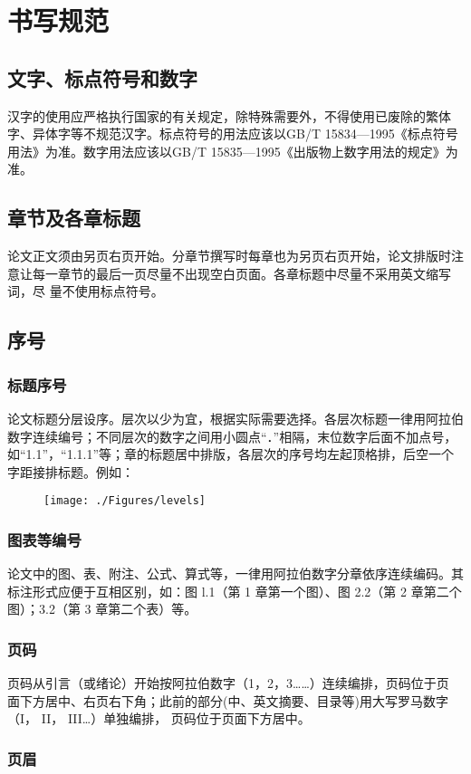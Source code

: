 
\chapter{书写规范}
\section{文字、标点符号和数字}
汉字的使用应严格执行国家的有关规定，除特殊需要外，不得使用已废除的繁体字、异体字等不规范汉字。标点符号的用法应该以GB/T 15834—1995《标点符号用法》为准。数字用法应该以GB/T 15835—1995《出版物上数字用法的规定》为准。
\section{章节及各章标题}
论文正文须由另页右页开始。分章节撰写时每章也为另页右页开始，论文排版时注 意让每一章节的最后一页尽量不出现空白页面。各章标题中尽量不采用英文缩写词，尽 量不使用标点符号。
\section{序号}
\subsection{标题序号}
论文标题分层设序。层次以少为宜，根据实际需要选择。各层次标题一律用阿拉伯数字连续编号；不同层次的数字之间用小圆点“．”相隔，末位数字后面不加点号，如“1.1”，“1.1.1”等；章的标题居中排版，各层次的序号均左起顶格排，后空一个字距接排标题。例如：
\begin{figure}[!hbp]
    \texttt{[image: ./Figures/levels]}
    \centering
    \label{fig:levels}
\end{figure}
\subsection{图表等编号}
论文中的图、表、附注、公式、算式等，一律用阿拉伯数字分章依序连续编码。其 标注形式应便于互相区别，如：图 l.1（第 1 章第一个图）、图 2.2（第 2 章第二个图）；3.2（第 3 章第二个表）等。
\subsection{页码}
页码从引言（或绪论）开始按阿拉伯数字（1，2，3……）连续编排，页码位于页 面下方居中、右页右下角；此前的部分(中、英文摘要、目录等)用大写罗马数字（I， II， III…）单独编排， 页码位于页面下方居中。
\subsection{页眉}

